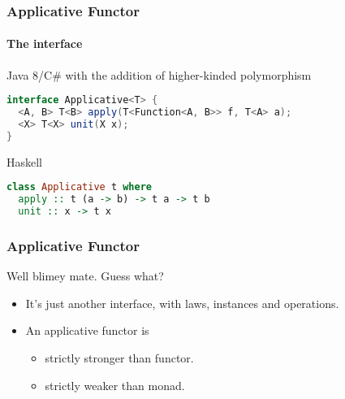 \begin{frame}[fragile]
\frametitle{Applicative Functor}
\framesubtitle{The interface}
\begin{block}{Java 8/C\# with the addition of higher-kinded polymorphism}
\begin{lstlisting}[style=language,language=java]
interface Applicative<T> {
  <A, B> T<B> apply(T<Function<A, B>> f, T<A> a);
  <X> T<X> unit(X x);
}
\end{lstlisting}
\end{block}
\begin{block}{Haskell}
\begin{lstlisting}[style=language,language=haskell]
class Applicative t where
  apply :: t (a -> b) -> t a -> t b
  unit :: x -> t x
\end{lstlisting}
\end{block}
\end{frame}

\begin{frame}[fragile]
\frametitle{Applicative Functor}
\begin{block}{Well blimey mate. Guess what?}
\begin{itemize}
\item It's just another interface, with laws, instances and operations.
\item An applicative functor is
  \begin{itemize}
  \item strictly stronger than functor.
  \item strictly weaker than monad.
  \end{itemize}
\end{itemize}
\end{block}
\end{frame}
